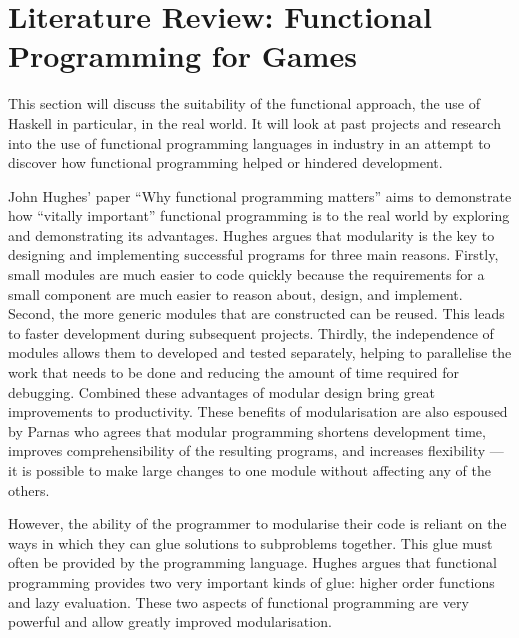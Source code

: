 \section{Literature Review: Functional Programming for Games}
\label{sec:fp_review}

\label{cf:code_organisation} %


This section will discuss the suitability of the functional approach, the use
of Haskell in particular, in the real world. It will look at past projects and
research into the use of functional programming languages in industry in an
attempt to discover how functional programming helped or hindered development.

John Hughes' paper ``Why functional programming matters'' aims to demonstrate how
``vitally important'' functional programming is to the real world by exploring and
demonstrating its advantages.\cite{hughes1989functional} Hughes argues that modularity
is the key to designing and implementing successful programs for three main reasons.
Firstly, small modules are much easier to code quickly because the requirements for
a small component are much easier to reason about, design, and implement. Second,
the more generic modules that are constructed can be reused. This leads to faster
development during subsequent projects. Thirdly, the independence of modules allows
them to developed and tested separately, helping to parallelise the work that needs
to be done and reducing the amount of time required for debugging. Combined these
advantages of modular design bring great improvements to productivity. These benefits
of modularisation are also espoused by Parnas who agrees that modular programming
shortens development time, improves comprehensibility of the resulting programs,
and increases flexibility --- it is possible to make large changes to one module
without affecting any of the others.\cite{parnas1972modular}

However, the ability of the programmer to modularise their code is reliant on the
ways in which they can glue solutions to subproblems together. This glue must
often be provided by the programming language. Hughes argues that functional
programming provides two very important kinds of glue: higher order functions
and lazy evaluation. These two aspects of functional programming are very powerful
and allow greatly improved modularisation.

